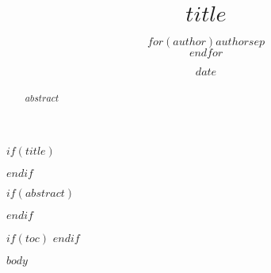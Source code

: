 \documentclass[$if(fontsize)$$fontsize$,$endif$$if(lang)$$babel-lang$,$endif$$if(papersize)$$papersize$paper,$endif$$if(beamer)$ignorenonframetext,$if(handout)$handout,$endif$$if(aspectratio)$aspectratio=$aspectratio$,$endif$$endif$$for(classoption)$$classoption$$sep$,$endfor$]{$documentclass$}
\title{\color{HTWGreenDark}$title$}
\author{$for(author)$$author$$sep$\\$endfor$}
\date{$date$}
\begin{document}
 $if(title)$
  \maketitle
 $endif$

 $if(abstract)$
 \begin{abstract}
  $abstract$
 \end{abstract}
 $endif$

 $if(toc)$
  \tableofcontents
 $endif$

 $body$
\end{document}
